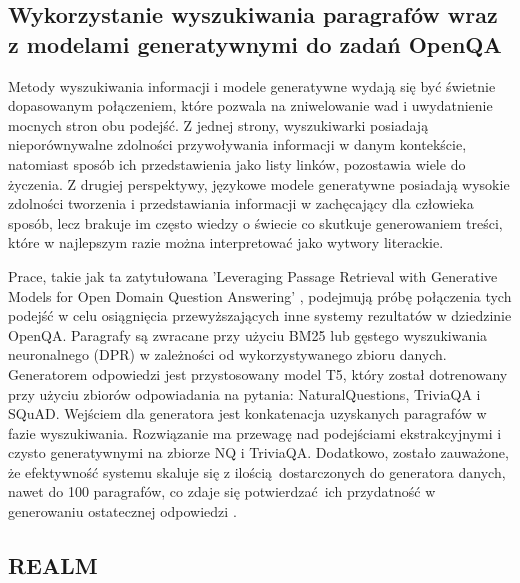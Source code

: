 \subsection{Wykorzystanie wyszukiwania paragrafów wraz z modelami generatywnymi do zadań OpenQA}

Metody wyszukiwania informacji i modele generatywne wydają się być świetnie dopasowanym połączeniem, które pozwala na zniwelowanie wad i uwydatnienie mocnych stron obu podejść. Z jednej strony, wyszukiwarki posiadają nieporównywalne zdolności przywoływania informacji w danym kontekście, natomiast sposób ich przedstawienia jako listy linków, pozostawia wiele do życzenia. Z drugiej perspektywy, językowe modele generatywne posiadają wysokie zdolności tworzenia i przedstawiania informacji w zachęcający dla człowieka sposób, lecz brakuje im często wiedzy o świecie co skutkuje generowaniem treści, które w najlepszym razie można interpretować jako wytwory literackie. \newline

Prace, takie jak ta zatytułowana 'Leveraging Passage Retrieval with Generative Models for Open Domain Question Answering' \autocite{izacard2020leveraging}, podejmują próbę połączenia tych podejść w celu osiągnięcia przewyższających inne systemy rezultatów w dziedzinie OpenQA. Paragrafy są zwracane przy użyciu BM25 lub gęstego wyszukiwania neuronalnego (DPR) w zależności od wykorzystywanego zbioru danych. Generatorem odpowiedzi jest przystosowany model T5, który został dotrenowany przy użyciu zbiorów odpowiadania na pytania: NaturalQuestions, TriviaQA i SQuAD. Wejściem dla generatora jest konkatenacja uzyskanych paragrafów w fazie wyszukiwania. Rozwiązanie ma przewagę nad podejściami ekstrakcyjnymi i czysto generatywnymi na zbiorze NQ i TriviaQA. Dodatkowo, zostało zauważone, że efektywność systemu skaluje się z ilością dostarczonych do generatora danych, nawet do 100 paragrafów, co zdaje się potwierdzać ich przydatność w generowaniu ostatecznej odpowiedzi \autocite{izacard2020leveraging}.

\subsection{REALM}

